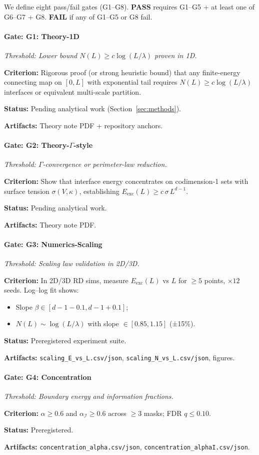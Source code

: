 \documentclass{article}
\newenvironment{vdmgate}[2]{%
  \paragraph{Gate: #1} \emph{Threshold: #2.}%
  \par\noindent}{\medskip}
\begin{document}
We define eight pass/fail gates (G1--G8). \textbf{PASS} requires G1--G5 + at least one of G6--G7 + G8. \textbf{FAIL} if any of G1--G5 or G8 fail.

\begin{vdmgate}{G1: Theory-1D}{Lower bound $N(L)\ge c\log(L/\lambda)$ proven in 1D}
\textbf{Criterion:} Rigorous proof (or strong heuristic bound) that any finite-energy connecting map on $[0,L]$ with exponential tail requires $N(L)\ge c\log(L/\lambda)$ interfaces or equivalent multi-scale partition.

\textbf{Status:} Pending analytical work (Section~\ref{sec:methods}).

\textbf{Artifacts:} Theory note PDF + repository anchors.
\end{vdmgate}

\begin{vdmgate}{G2: Theory-$\Gamma$-style}{$\Gamma$-convergence or perimeter-law reduction}
\textbf{Criterion:} Show that interface energy concentrates on codimension-1 sets with surface tension $\sigma(V,\kappa)$, establishing $E_{\text{exc}}(L)\ge c\,\sigma\,L^{d-1}$.

\textbf{Status:} Pending analytical work.

\textbf{Artifacts:} Theory note PDF.
\end{vdmgate}

\begin{vdmgate}{G3: Numerics-Scaling}{Scaling law validation in 2D/3D}
\textbf{Criterion:} In 2D/3D RD sims, measure $E_{\text{exc}}(L)$ vs $L$ for $\ge 5$ points, $\times 12$ seeds. Log--log fit shows:
\begin{itemize}
    \item Slope $\beta\in[d-1-0.1, d-1+0.1]$;
    \item $N(L)\sim \log(L/\lambda)$ with slope $\in[0.85,1.15]$ (±15\%).
\end{itemize}

\textbf{Status:} Preregistered experiment suite.

\textbf{Artifacts:} \texttt{scaling\_E\_vs\_L.csv/json}, \texttt{scaling\_N\_vs\_L.csv/json}, figures.
\end{vdmgate}

\begin{vdmgate}{G4: Concentration}{Boundary energy and information fractions}
\textbf{Criterion:} $\alpha\ge 0.6$ and $\alpha_\mathcal{I}\ge 0.6$ across $\ge 3$ masks; FDR $q\le 0.10$.

\textbf{Status:} Preregistered.

\textbf{Artifacts:} \texttt{concentration\_alpha.csv/json}, \texttt{concentration\_alphaI.csv/json}.
\end{vdmgate}
\end{document}
